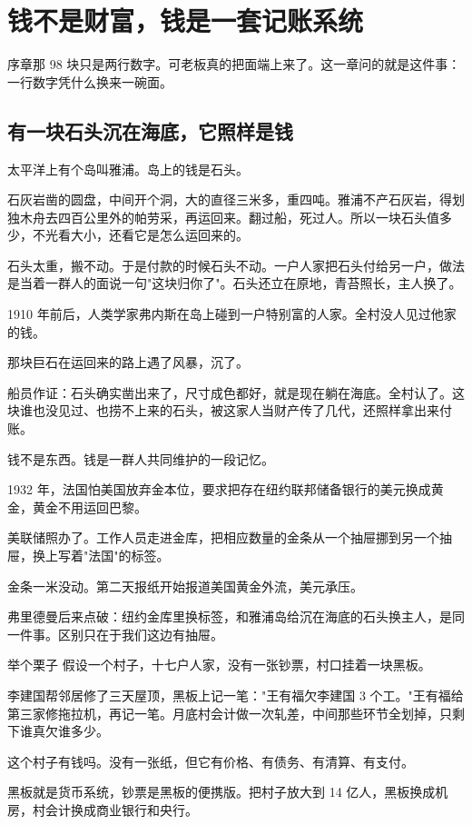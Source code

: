 \chapter{钱不是财富，钱是一套记账系统}

\begin{ledetext}
序章那 98 块只是两行数字。可老板真的把面端上来了。这一章问的就是这件事：一行数字凭什么换来一碗面。
\end{ledetext}

\section{有一块石头沉在海底，它照样是钱}

太平洋上有个岛叫雅浦。岛上的钱是石头。

石灰岩凿的圆盘，中间开个洞，大的直径三米多，重四吨。雅浦不产石灰岩，得划独木舟去四百公里外的帕劳采，再运回来。翻过船，死过人。所以一块石头值多少，不光看大小，还看它是怎么运回来的。

石头太重，搬不动。于是付款的时候石头不动。一户人家把石头付给另一户，做法是当着一群人的面说一句"这块归你了"。石头还立在原地，青苔照长，主人换了。

1910 年前后，人类学家弗内斯在岛上碰到一户特别富的人家。全村没人见过他家的钱。

那块巨石在运回来的路上遇了风暴，沉了。

船员作证：石头确实凿出来了，尺寸成色都好，就是现在躺在海底。全村认了。这块谁也没见过、也捞不上来的石头，被这家人当财产传了几代，还照样拿出来付账。

\begin{pullquote}{}
钱不是东西。钱是一群人共同维护的一段记忆。
\end{pullquote}

1932 年，法国怕美国放弃金本位，要求把存在纽约联邦储备银行的美元换成黄金，黄金不用运回巴黎。

美联储照办了。工作人员走进金库，把相应数量的金条从一个抽屉挪到另一个抽屉，换上写着"法国"的标签。

金条一米没动。第二天报纸开始报道美国黄金外流，美元承压。

弗里德曼后来点破：纽约金库里换标签，和雅浦岛给沉在海底的石头换主人，是同一件事。区别只在于我们这边有抽屉。

\begin{egbox}{举个栗子}
假设一个村子，十七户人家，没有一张钞票，村口挂着一块黑板。

李建国帮邻居修了三天屋顶，黑板上记一笔："王有福欠李建国 3 个工。"王有福给第三家修拖拉机，再记一笔。月底村会计做一次轧差，中间那些环节全划掉，只剩下谁真欠谁多少。

这个村子有钱吗。没有一张纸，但它有价格、有债务、有清算、有支付。

黑板就是货币系统，钞票是黑板的便携版。把村子放大到 14 亿人，黑板换成机房，村会计换成商业银行和央行。

\end{egbox}


